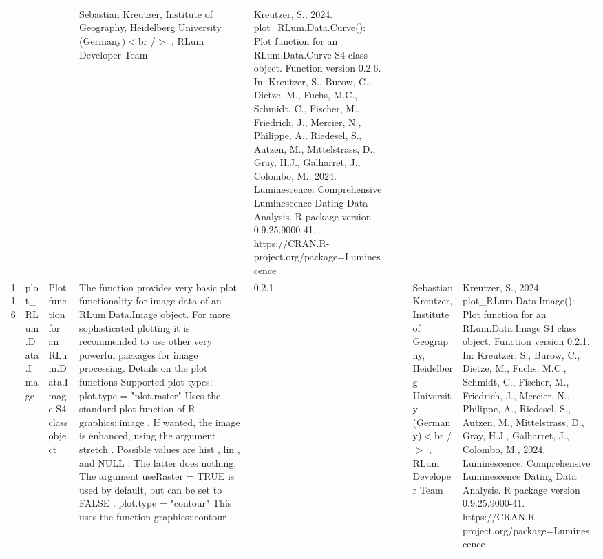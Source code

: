 \begin{table}[ht]
\begin{tabular}{rllllllll}
 &  &  & Sebastian Kreutzer, Institute of Geography, Heidelberg University (Germany)$<$br /$>$ , RLum Developer Team & Kreutzer, S., 2024. plot\_RLum.Data.Curve(): Plot function for an RLum.Data.Curve S4 class object. Function version 0.2.6. In: Kreutzer, S., Burow, C., Dietze, M., Fuchs, M.C., Schmidt, C., Fischer, M., Friedrich, J., Mercier, N., Philippe, A., Riedesel, S., Autzen, M., Mittelstrass, D., Gray, H.J., Galharret, J., Colombo, M., 2024. Luminescence: Comprehensive Luminescence Dating Data Analysis. R package version 0.9.25.9000-41. https://CRAN.R-project.org/package=Luminescence
 \\ 
  116 & plot\_RLum.Data.Image & Plot function for an  RLum.Data.Image  S4 class object & The function provides very basic plot functionality for image data of an RLum.Data.Image  object. For more sophisticated plotting it is recommended to use other very powerful packages for image processing.  Details on the plot functions   Supported plot types:  plot.type = "plot.raster"   Uses the standard plot function of R  graphics::image . If wanted, the image is enhanced, using the argument  stretch . Possible values are  hist ,  lin , and NULL . The latter does nothing. The argument  useRaster = TRUE  is used by default, but can be set to  FALSE .  plot.type = "contour"   This uses the function  graphics::contour & 0.2.1
 &  &  & Sebastian Kreutzer, Institute of Geography, Heidelberg University (Germany)$<$br /$>$ , RLum Developer Team & Kreutzer, S., 2024. plot\_RLum.Data.Image(): Plot function for an RLum.Data.Image S4 class object. Function version 0.2.1. In: Kreutzer, S., Burow, C., Dietze, M., Fuchs, M.C., Schmidt, C., Fischer, M., Friedrich, J., Mercier, N., Philippe, A., Riedesel, S., Autzen, M., Mittelstrass, D., Gray, H.J., Galharret, J., Colombo, M., 2024. Luminescence: Comprehensive Luminescence Dating Data Analysis. R package version 0.9.25.9000-41. https://CRAN.R-project.org/package=Luminescence
 \\ 

\end{tabular}
\end{table}
